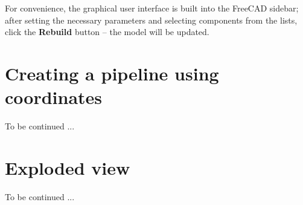 \documentclass[a4paper,12pt]{article}
\begin{document}
For convenience, the graphical user interface is built into the FreeCAD sidebar; after setting the necessary parameters and selecting components from the lists, click the \textbf{Rebuild} button -- the model will be updated.

\pagebreak




\section{Creating a pipeline using coordinates}
To be continued ...




\section{Exploded view}
To be continued ...
\end{document}
